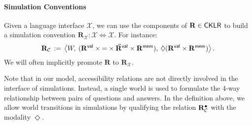 \documentclass[sigplan,screen]{acmart}
\begin{document}

\paragraph{Simulation Conventions} %

Given a language interface $\mathcal{X}$,
we can use the components of
$\mathbf{R} \in  \mathsf{CKLR} $
to build a simulation convention
$\mathbf{R}_\mathcal{X} : \mathcal{X} \Leftrightarrow \mathcal{X}$.
For instance:
\[
  \mathbf{R}_\mathcal{C} \, := \,
    \big\langle
      W, \:
      (\mathbf{R}^{ \mathsf{val} } \times {=} \times
       \vec{\mathbf{R}}^{ \mathsf{val} } \times \mathbf{R}^{ \mathsf{mem} }), \:
      \Diamond (\mathbf{R}^{ \mathsf{val} } \times \mathbf{R}^{ \mathsf{mem} })
    \big\rangle \,.
\]
We will often implicitly promote $\mathbf{R}$ to $\mathbf{R}_\mathcal{X}$.

Note that in our model,
accessibility relations are not directly involved
in the interface of simulations.
Instead,
a single world is used to formulate
the 4-way relationship between
pairs of questions and answers.
In the definition above,
we allow world transitions in simulations
by qualifying the relation $\mathbf{R}_\mathcal{C}^\bullet$
with the modality $\Diamond$.

\end{document}
